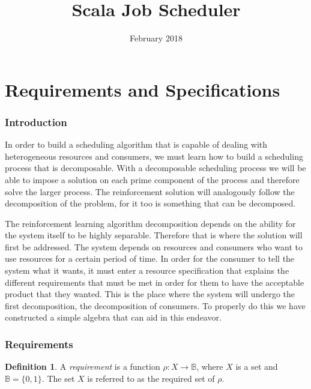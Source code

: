 \documentclass{article}
\title{Scala Job Scheduler}
\date{February 2018}
\theoremstyle{definition}
\newtheorem{definition}{Definition}[section]
\theoremstyle{remark}
\newcommand{\reqfunc}[2]{#1:#2\rightarrow\mathbb{B}}
\begin{document}
	
	\maketitle
	
	\newpage
	\tableofcontents
	
	\newpage
	
	\part{Requirements and Specifications}
	
	\section{Introduction}
	
		\indent
		
		In order to build a scheduling algorithm that is capable of dealing with heterogeneous resources and consumers, we must learn how to build a scheduling process that is decomposable. With a decomposable scheduling process we will be able to impose a solution on each prime component of the process and therefore solve the larger process. The reinforcement solution will analogously follow the decomposition of the problem, for it too is something that can be decomposed.
		
		The reinforcement learning algorithm decomposition depends on the ability for the system itself to be highly separable. Therefore that is where the solution will first be addressed. The system depends on resources and consumers who want to use resources for a certain period of time. In order for the consumer to tell the system what it wants, it must enter a resource specification that explains the different requirements that must be met in order for them to have the acceptable product that they wanted. This is the place where the system will undergo the first decomposition, the decomposition of consumers. To properly do this we have constructed a simple algebra that can aid in this endeavor.
	
	\section{Requirements}
	
		\begin{definition}
			A \emph{requirement} is a function $\reqfunc{\rho}{X}$, where $X$ is a set and $\mathbb{B} = \{0,1\}$. The set $X$ is referred to as the required set of $\rho$.
		\end{definition}
		
\end{document}
